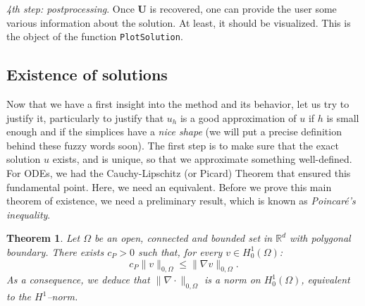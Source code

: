 \documentclass{article}
\newtheorem{theorem}{Theorem}
\begin{document}
\medskip

\emph{4th step: postprocessing}. Once $\mathbf{U}$ is recovered, one can provide the user some various information about the solution. At least, it should be visualized. This is the object of the function
\texttt{PlotSolution}.


\subsection{Existence of solutions}

Now that we have a first insight into the method and its behavior, let us try to justify it, particularly to justify that $u_h$ is a good approximation of $u$ if $h$ is small enough and if the simplices have a \emph{nice shape} (we will put a precise definition behind these fuzzy words soon). The first step is to make sure that the exact solution $u$ exists, and is unique, so that we approximate something well-defined. For ODEs, we had the Cauchy-Lipschitz (or Picard) Theorem that ensured this fundamental point. Here, we need an equivalent. Before we prove this main theorem of existence, we need a preliminary result, which is known as \emph{Poincaré's inequality}. %

\begin{theorem} \label{thm:Poincare}
Let $\Omega$ be an open, connected and bounded set in $\mathbb{R}^d$ with polygonal boundary. There exists $c_P > 0$ such that, for every $v \in H^1_0(\Omega)$:
\begin{equation}
    \label{eq:Poincare}
    c_P \| v \|_{0,\Omega} \leq
    \| \nabla v \|_{0,\Omega}.
\end{equation}
As a consequence, we deduce that $\| \nabla \cdot \|_{0,\Omega}$ is a norm on $H^1_0(\Omega)$, equivalent to the $H^1$--norm.
\end{theorem}
\end{document}
